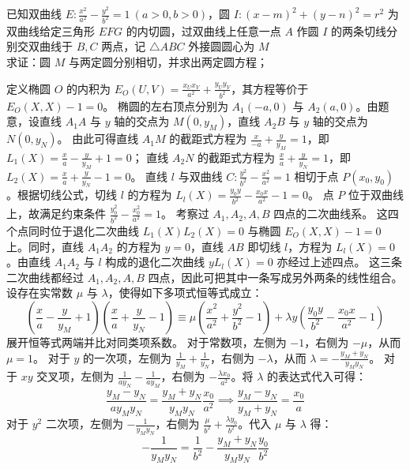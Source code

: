 \begin{exercise}
已知双曲线 \(E: \frac{x^2}{a^2} - \frac{y^2}{b^2} = 1\ (a > 0, b > 0)\)，圆 \(I: (x - m)^2 + (y - n)^2 = r^2\) 为双曲线给定三角形 \(EFG\) 的内切圆，过双曲线上任意一点 \(A\) 作圆 \(I\) 的两条切线分别交双曲线于 \(B,C\) 两点，记 \(\triangle ABC\) 外接圆圆心为 \(M\)\\
求证：圆 \(M\) 与两定圆分别相切，并求出两定圆方程；
\end{exercise}
\begin{solution}
定义椭圆 $O$ 的内积为 $E_O(U, V) = \frac{x_U x_V}{a^2} + \frac{y_U y_V}{b^2}$，其方程等价于 $E_O(X, X) - 1 = 0$。
椭圆的左右顶点分别为 $A_1(-a, 0)$ 与 $A_2(a, 0)$。由题意，设直线 $A_1A$ 与 $y$ 轴的交点为 $M(0, y_M)$，直线 $A_2B$ 与 $y$ 轴的交点为 $N(0, y_N)$。
由此可得直线 $A_1M$ 的截距式方程为 $\frac{x}{-a} + \frac{y}{y_M} = 1$，即 $L_1(X) = \frac{x}{a} - \frac{y}{y_M} + 1 = 0$；
直线 $A_2N$ 的截距式方程为 $\frac{x}{a} + \frac{y}{y_N} = 1$，即 $L_2(X) = \frac{x}{a} + \frac{y}{y_N} - 1 = 0$。
直线 $l$ 与双曲线 $C: \frac{y^2}{b^2} - \frac{x^2}{a^2} = 1$ 相切于点 $P(x_0, y_0)$。根据切线公式，切线 $l$ 的方程为 $L_l(X) = \frac{y_0 y}{b^2} - \frac{x_0 x}{a^2} - 1 = 0$。
点 $P$ 位于双曲线上，故满足约束条件 $\frac{y_0^2}{b^2} - \frac{x_0^2}{a^2} = 1$。
考察过 $A_1, A_2, A, B$ 四点的二次曲线系。
这四个点同时位于退化二次曲线 $L_1(X)L_2(X) = 0$ 与椭圆 $E_O(X, X) - 1 = 0$ 上。同时，直线 $A_1A_2$ 的方程为 $y = 0$，直线 $AB$ 即切线 $l$，方程为 $L_l(X) = 0$。由直线 $A_1A_2$ 与 $l$ 构成的退化二次曲线 $y L_l(X) = 0$ 亦经过上述四点。
这三条二次曲线都经过 $A_1,A_2,A,B$ 四点，因此可把其中一条写成另外两条的线性组合。设存在实常数 $\mu$ 与 $\lambda$，使得如下多项式恒等式成立：
$$ \left(\frac{x}{a} - \frac{y}{y_M} + 1\right)\left(\frac{x}{a} + \frac{y}{y_N} - 1\right) \equiv \mu \left(\frac{x^2}{a^2} + \frac{y^2}{b^2} - 1\right) + \lambda y \left(\frac{y_0 y}{b^2} - \frac{x_0 x}{a^2} - 1\right) $$
展开恒等式两端并比对同类项系数。
对于常数项，左侧为 $-1$，右侧为 $-\mu$，从而 $\mu = 1$。
对于 $y$ 的一次项，左侧为 $\frac{1}{y_M} + \frac{1}{y_N}$，右侧为 $-\lambda$，从而 $\lambda = -\frac{y_M + y_N}{y_M y_N}$。
对于 $xy$ 交叉项，左侧为 $\frac{1}{a y_N} - \frac{1}{a y_M}$，右侧为 $-\frac{\lambda x_0}{a^2}$。将 $\lambda$ 的表达式代入可得：
$$ \frac{y_M - y_N}{a y_M y_N} = \frac{y_M + y_N}{y_M y_N} \frac{x_0}{a^2} \implies \frac{y_M - y_N}{y_M + y_N} = \frac{x_0}{a} $$
对于 $y^2$ 二次项，左侧为 $-\frac{1}{y_M y_N}$，右侧为 $\frac{\mu}{b^2} + \frac{\lambda y_0}{b^2}$。代入 $\mu$ 与 $\lambda$ 得：
$$ -\frac{1}{y_M y_N} = \frac{1}{b^2} - \frac{y_M + y_N}{y_M y_N} \frac{y_0}{b^2} $$

\end{solution}
